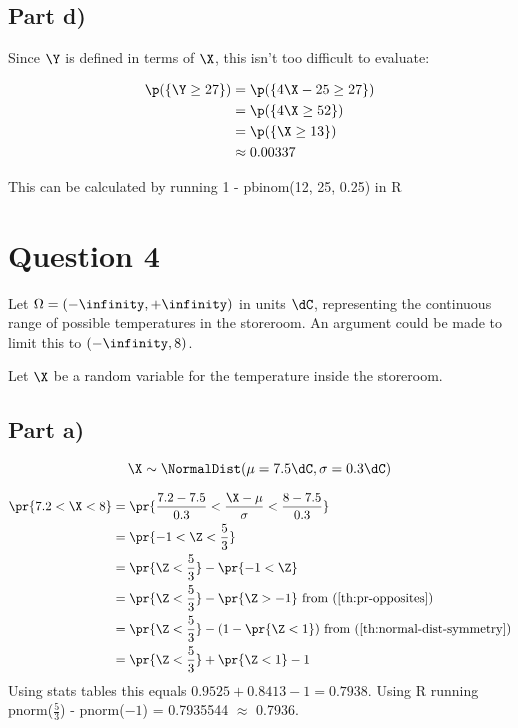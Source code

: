 \subsection*{Part d)}

Since $\Y$ is defined in terms of $\X$, this isn't too difficult to evaluate:

\begin{align*}
\p(\{ \Y \geq 27 \}) &= \p(\{ 4\X - 25 \geq 27 \}) \\
&= \p(\{ 4\X \geq 52\}) \\
&= \p(\{ \X \geq 13 \}) \\
&\approx 0.00337
\end{align*}

This can be calculated by running 1 - pbinom(12, 25, 0.25) in R

\newpage

\section*{Question 4}

Let $\Omega = (-\infinity, +\infinity)$ in units $\dC$, representing the continuous range of possible temperatures in the storeroom.
An argument could be made to limit this to $(-\infinity, 8)$.

Let $\X$ be a random variable for the temperature inside the storeroom.

\subsection*{Part a)}

\[
\X \sim \NormalDist (\mu = 7.5\dC, \sigma = 0.3\dC)
\]

\begin{align*}
\pr{7.2 < \X < 8} &= \pr{\frac{7.2 - 7.5}{0.3} < \frac{\X - \mu}{\sigma} < \frac{8 - 7.5}{0.3}} \\
&= \pr{-1 < \Z < \frac{5}{3}} \\
&= \pr{\Z < \frac{5}{3}} - \pr{-1 < \Z} \\
&= \pr{\Z < \frac{5}{3}} - \pr{\Z > -1}
\text{	from (\ref{th:pr-opposites})} \\
&= \pr{\Z < \frac{5}{3}} - (1 - \pr{\Z < 1})
\text{	from (\ref{th:normal-dist-symmetry})} \\
&= \pr{\Z < \frac{5}{3}} + \pr{\Z < 1} - 1
\end{align*}
Using stats tables this equals $0.9525 + 0.8413 - 1 = 0.7938$.
Using R running pnorm($\frac{5}{3}$) - pnorm($-1$) = 0.7935544 $\approx$ 0.7936.


